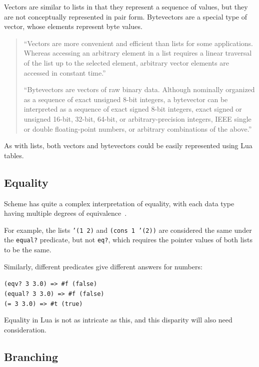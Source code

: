 Vectors are similar to lists in that they represent a sequence of values, but
they are not conceptually represented in pair form. Bytevectors are a special
type of vector, whose elements represent byte values.
\begin{quotation}
``Vectors are more convenient and efficient than lists for some applications.
Whereas accessing an arbitrary element in a list requires a linear traversal of
the list up to the selected element, arbitrary vector elements are accessed in
constant time.''~\cite[Sec~6.9]{tspl}

``Bytevectors are vectors of raw binary data. Although nominally organized as a
sequence of exact unsigned 8-bit integers, a bytevector can be interpreted as a
sequence of exact signed 8-bit integers, exact signed or unsigned 16-bit,
32-bit, 64-bit, or arbitrary-precision integers, IEEE single or double
floating-point numbers, or arbitrary combinations of the
above.''~\cite[Sec~6.10]{tspl}
\end{quotation} 
As with lists, both vectors and bytevectors could be easily represented using Lua tables.

\subsection{Equality}

Scheme has quite a complex interpretation of equality, with each data type
having multiple degrees of equivalence~\cite[Sec~6.2]{tspl}.
\begin{framed}
For example, the lists \texttt{'(1 2)} and \texttt{(cons 1 '(2))} are considered
the same under the \texttt{equal?} predicate, but not \texttt{eq?}, which
requires the pointer values of both lists to be the same.

Similarly, different predicates give different answers for numbers:
\begin{center}
\ttfamily
\verb|(eqv? 3 3.0) => #f (false)| \\
\verb|(equal? 3 3.0) => #f (false)| \\
\verb|(= 3 3.0) => #t (true)|
\end{center}
\end{framed}
Equality in Lua is not as intricate as this, and this disparity will also need
consideration.

\subsection{Branching}

